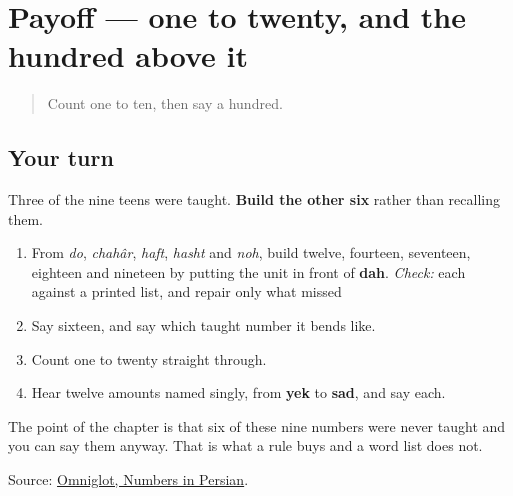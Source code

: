 \section[Practice]{Payoff — one to twenty, and the hundred above it}

\label{lesson:FA-C18-practice}



\begin{quote}
Count one to ten, then say a hundred.
\end{quote}

\subsection*{Your turn}
Three of the nine teens were taught. \textbf{Build the other six} rather than recalling them.

\begin{enumerate}
\raggedright
  \item From \emph{do}, \emph{chahâr}, \emph{haft}, \emph{hasht} and \emph{noh}, build twelve, fourteen, seventeen, eighteen and nineteen by putting the unit in front of \textbf{dah}. \emph{Check:} each against a printed list, and repair only what missed
  \item Say sixteen, and say which taught number it bends like.
  \item Count one to twenty straight through.
  \item Hear twelve amounts named singly, from \textbf{yek} to \textbf{sad}, and say each.
\end{enumerate}

The point of the chapter is that six of these nine numbers were never taught and you can say them anyway. That is what a rule buys and a word list does not.

\begin{tcolorbox}[breakable,colback=teal!4,colframe=teal!35!black,title={Before you move on}]
Source: \href{https://www.omniglot.com/language/numbers/persian.htm}{Omniglot, Numbers in Persian}.
\end{tcolorbox}
